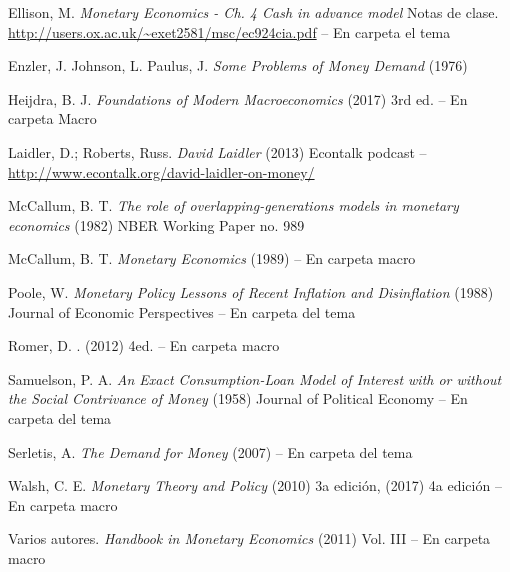 \documentclass{nuevotema}
\begin{document}
Ellison, M. \textit{Monetary Economics - Ch. 4 Cash in advance model}  Notas de clase. \url{http://users.ox.ac.uk/~exet2581/msc/ec924cia.pdf} -- En carpeta el tema 

Enzler, J. Johnson, L. Paulus, J. \textit{Some Problems of Money Demand} (1976) 

Heijdra, B. J. \textit{Foundations of Modern Macroeconomics} (2017) 3rd ed. -- En carpeta Macro

Laidler, D.; Roberts, Russ. \textit{David Laidler} (2013) Econtalk podcast -- \url{http://www.econtalk.org/david-laidler-on-money/}

McCallum, B. T. \textit{The role of overlapping-generations models in monetary economics} (1982) NBER Working Paper no. 989

McCallum, B. T. \textit{Monetary Economics} (1989) -- En carpeta macro

Poole, W. \textit{Monetary Policy Lessons of Recent Inflation and Disinflation} (1988) Journal of Economic Perspectives -- En carpeta del tema

Romer, D. . (2012) 4ed. -- En carpeta macro

Samuelson, P. A. \textit{An Exact Consumption-Loan Model of Interest with or without the Social Contrivance of Money} (1958) Journal of Political Economy -- En carpeta del tema

Serletis, A. \textit{The Demand for Money} (2007) -- En carpeta del tema

Walsh, C. E. \textit{Monetary Theory and Policy} (2010) 3a edición, (2017) 4a edición -- En carpeta macro

Varios autores. \textit{Handbook in Monetary Economics} (2011) Vol. III -- En carpeta macro
\end{document}
